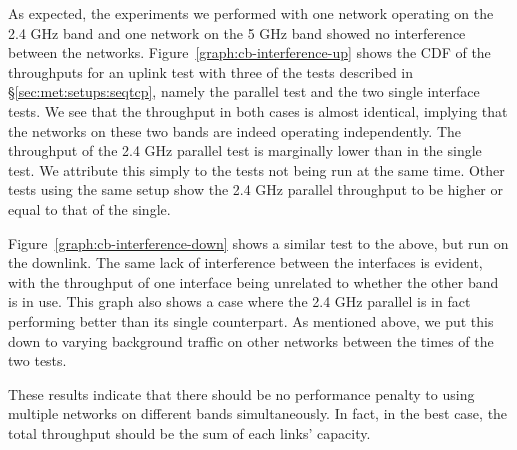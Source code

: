 As expected, the experiments we performed with one network operating on the 2.4
GHz band and one network on the 5 GHz band showed no interference between
the networks.  Figure~\ref{graph:cb-interference-up} shows the CDF of the
throughputs for an uplink test with three of the tests described in 
\S\ref{sec:met:setups:seqtcp}, namely the parallel test and the two single interface tests.
 We see that the throughput in both cases is almost identical,
implying that the networks on these two bands are indeed 
operating independently. The throughput of the 2.4 GHz parallel test is 
marginally lower than in the single test. We attribute this simply to the tests 
not being run at the same time. Other tests using the same setup show the 2.4 
GHz parallel throughput to be higher or equal to that of the single.


Figure~\ref{graph:cb-interference-down} shows a similar test to the above, but
run on the downlink. The same lack of interference between the interfaces
is evident, with the throughput of one interface being unrelated to whether the
other band is in use. This graph also shows a case where the 2.4 GHz
parallel is in fact performing better than its single counterpart. As mentioned
above, we put this down to varying background traffic on other networks
between the times of the two tests.

These results indicate that there should be no performance penalty to using
multiple networks on different bands simultaneously. In fact, in the best case,
the total throughput should be the sum of each links' capacity.


